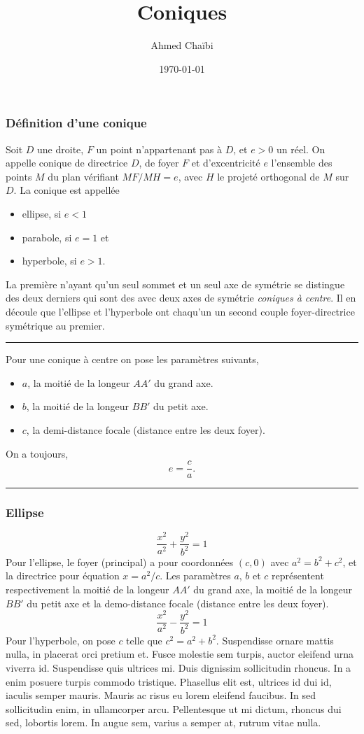 \documentclass{article}
\title{Coniques}
\author{Ahmed Chaïbi}
\date{\today}
\begin{document}
\maketitle
\subsubsection*{Définition d'une conique}
Soit $D$ une droite, $F$ un point n'appartenant pas à $D$, et $e>0$ un réel. On appelle conique de directrice $D$, de foyer $F$ et d'excentricité $e$ l'ensemble des points $M$ du plan vérifiant $MF/MH=e$, avec $H$ le projeté orthogonal de $M$ sur $D$. La conique est appellée
\begin{itemize}
	\item ellipse, si $e<1$
	\item parabole, si $e=1$ et
	\item hyperbole, si $e>1$. 
	\end{itemize}
	La première n'ayant qu'un seul sommet et un seul axe de symétrie se distingue des deux derniers qui sont des avec deux axes de symétrie \textit{coniques à centre}. Il en découle que l'ellipse et l'hyperbole ont chaqu'un un second couple foyer-directrice symétrique au premier. 

\vspace{0.3cm}
\hrule
\vspace{0.3cm}

Pour une conique à centre on pose les paramètres suivants,
\begin{itemize}
	\item $a$, la moitié de la longeur $AA'$ du grand axe.
	\item $b$, la moitié de la longeur $BB'$ du petit axe.
		\item $c$, la demi-distance focale (distance entre les deux foyer).
		\end{itemize}
On a toujours, $$e=\frac{c}{a}.$$


\vspace{0.3cm}
\hrule
\vspace{0.3cm}

\subsubsection*{Ellipse}
$$\frac{x^2}{a^2}+\frac{y^2}{b^2}=1$$
Pour l'ellipse, le foyer (principal) a pour coordonnées $(c,0)$ avec $a^2=b^2+c^2$, et la directrice pour équation $x=a^2/c$. Les paramètres $a$, $b$ et $c$ représentent respectivement la moitié de la longeur $AA'$ du grand axe, la moitié de la longeur $BB'$ du petit axe et la demo-distance focale (distance entre les deux foyer).
$$\frac{x^2}{a^2}-\frac{y^2}{b^2}=1$$
Pour l'hyperbole, on pose $c$ telle que $c^2=a^2+b^2$.
Suspendisse ornare mattis nulla, in placerat orci pretium et. Fusce molestie sem turpis, auctor eleifend urna viverra id. Suspendisse quis ultrices mi. Duis dignissim sollicitudin rhoncus. In a enim posuere turpis commodo tristique. Phasellus elit est, ultrices id dui id, iaculis semper mauris. Mauris ac risus eu lorem eleifend faucibus. In sed sollicitudin enim, in ullamcorper arcu. Pellentesque ut mi dictum, rhoncus dui sed, lobortis lorem. In augue sem, varius a semper at, rutrum vitae nulla.
\end{document}
